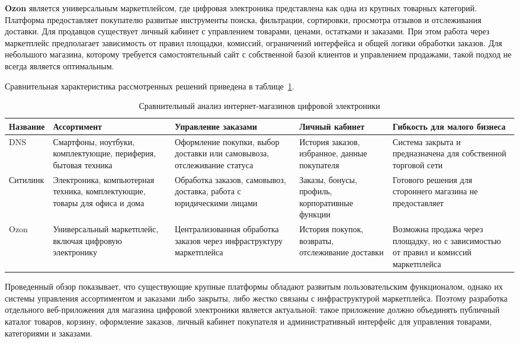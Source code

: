 \textbf{Ozon} является универсальным маркетплейсом, где цифровая электроника представлена как одна из крупных товарных категорий. Платформа предоставляет покупателю развитые инструменты поиска, фильтрации, сортировки, просмотра отзывов и отслеживания доставки. Для продавцов существует личный кабинет с управлением товарами, ценами, остатками и заказами. При этом работа через маркетплейс предполагает зависимость от правил площадки, комиссий, ограничений интерфейса и общей логики обработки заказов. Для небольшого магазина, которому требуется самостоятельный сайт с собственной базой клиентов и управлением продажами, такой подход не всегда является оптимальным.

Сравнительная характеристика рассмотренных решений приведена в таблице~\ref{tab:electronics_competitors}.

\begin{table}[H]
    \centering
    \caption{Сравнительный анализ интернет-магазинов цифровой электроники}
    \label{tab:electronics_competitors}
    \small
    \begin{tabular}{|p{2.4cm}|p{3.1cm}|p{3.4cm}|p{3.1cm}|p{3.1cm}|}
        \hline
        \textbf{Название} & \textbf{Ассортимент} & \textbf{Управление заказами} & \textbf{Личный кабинет} & \textbf{Гибкость для малого бизнеса} \\ \hline
        DNS & Смартфоны, ноутбуки, комплектующие, периферия, бытовая техника & Оформление покупки, выбор доставки или самовывоза, отслеживание статуса & История заказов, избранное, данные покупателя & Система закрыта и предназначена для собственной торговой сети \\ \hline
        Ситилинк & Электроника, компьютерная техника, комплектующие, товары для офиса и дома & Обработка заказов, самовывоз, доставка, работа с юридическими лицами & Заказы, бонусы, профиль, корпоративные функции & Готового решения для стороннего магазина не предоставляет \\ \hline
        Ozon & Универсальный маркетплейс, включая цифровую электронику & Централизованная обработка заказов через инфраструктуру маркетплейса & История покупок, возвраты, отслеживание доставки & Возможна продажа через площадку, но с зависимостью от правил и комиссий маркетплейса \\ \hline
    \end{tabular}
\end{table}

Проведенный обзор показывает, что существующие крупные платформы обладают развитым пользовательским функционалом, однако их системы управления ассортиментом и заказами либо закрыты, либо жестко связаны с инфраструктурой маркетплейса. Поэтому разработка отдельного веб-приложения для магазина цифровой электроники является актуальной: такое приложение должно объединять публичный каталог товаров, корзину, оформление заказов, личный кабинет покупателя и административный интерфейс для управления товарами, категориями и заказами.

